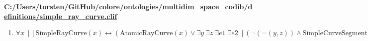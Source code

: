 \documentclass{article}
\begin{document}
\textbf{\url{C:/Users/torsten/GitHub/colore/ontologies/multidim\_space\_codib/definitions/simple\_ray\_curve.clif}}

\begin{enumerate}
\item $\forall x\;  \left[ \left[ \textrm{SimpleRayCurve}(x) \leftrightarrow \left(\textrm{AtomicRayCurve}(x) \lor \exists y\; \exists z\; \exists e1\; \exists e2\;  \left[ \left(\neg \left(\textrm{=}(y,z)\right) \land \textrm{SimpleCurveSegment}(y) \land \textrm{Endpoint}(e1,y) \land \textrm{Endpoint}(e2,y) \land \textrm{PP}(y,x) \land \textrm{AtomicRayCurve}(z) \land \textrm{Endpoint}(e1,z) \land \textrm{Endpoint}(e2,z) \land \textrm{PP}(z,x) \land \neg \left(\textrm{PO}(y,z)\right) \land \forall v\;  \left[ \left[ \left(\textrm{PP}(v,x) \land \neg \left(\textrm{=}(v,z)\right)\right) \rightarrow \textrm{P}(v,y) \right] \right]\right) \right]\right) \right] \right]$
\end{enumerate}
\end{document}
